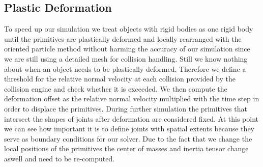 \documentclass[
	11pt, 
	DIV10,
	a4paper, 
	oneside, 
	headings=normal, 
	captions=tableheading,
	final, 
	numbers=noenddot
]{scrartcl}
\begin{document}
\subsection{Plastic Deformation}
	To speed up our simulation we treat objects with rigid bodies as one rigid body until the primitives are plastically deformed and locally rearranged with the oriented particle method without harming the accuracy of our simulation since we are still using a detailed mesh for collision handling. Still we know nothing about when an object needs to be plastically deformed. Therefore we define a threshold for the relative normal velocity at each collision provided by the collision engine and check whether it is exceeded. We then compute the deformation offset as the relative normal velocity multiplied with the time step in order to displace the primitives. During further simulation the primitives that intersect the shapes of joints after deformation are considered fixed. At this point we can see how important it is to define joints with spatial extents because they serve as boundary conditions for our solver. Due to the fact that we change the local positions of the primitives the center of masses and inertia tensor change aswell and need to be re-computed.
\end{document}
